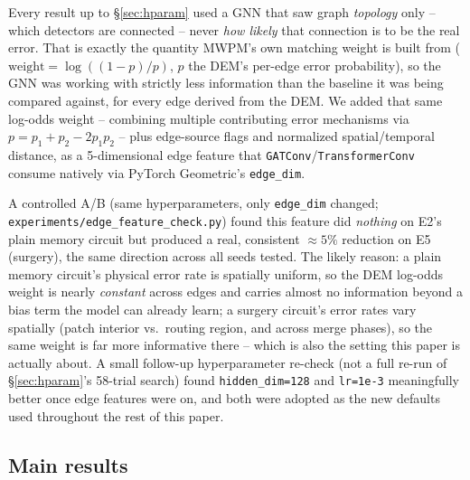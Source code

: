 \documentclass[11pt]{article}
\begin{document}
Every result up to \S\ref{sec:hparam} used a GNN that saw graph
\emph{topology} only -- which detectors are connected -- never \emph{how
likely} that connection is to be the real error. That is exactly the
quantity MWPM's own matching weight is built from
($\text{weight} = \log((1-p)/p)$, $p$ the DEM's per-edge error probability),
so the GNN was working with strictly less information than the baseline it
was being compared against, for every edge derived from the DEM. We added
that same log-odds weight -- combining multiple contributing error
mechanisms via $p = p_1 + p_2 - 2p_1p_2$ -- plus edge-source flags and
normalized spatial/temporal distance, as a 5-dimensional edge feature that
\texttt{GATConv}/\texttt{TransformerConv} consume natively via PyTorch
Geometric's \texttt{edge\_dim}.

A controlled A/B (same hyperparameters, only \texttt{edge\_dim} changed;
\texttt{experiments/edge\_feature\_check.py}) found this feature did
\emph{nothing} on E2's plain memory circuit but produced a real, consistent
$\approx 5\%$ reduction on E5 (surgery), the same direction across all
seeds tested. The likely reason: a plain memory circuit's physical error
rate is spatially uniform, so the DEM log-odds weight is nearly
\emph{constant} across edges and carries almost no information beyond a
bias term the model can already learn; a surgery circuit's error rates vary
spatially (patch interior vs.\ routing region, and across merge phases), so
the same weight is far more informative there -- which is also the setting
this paper is actually about. A small follow-up hyperparameter re-check
(not a full re-run of \S\ref{sec:hparam}'s 58-trial search) found
\texttt{hidden\_dim=128} and \texttt{lr=1e-3} meaningfully better once edge
features were on, and both were adopted as the new defaults used
throughout the rest of this paper.

\subsection{Main results}
\end{document}
